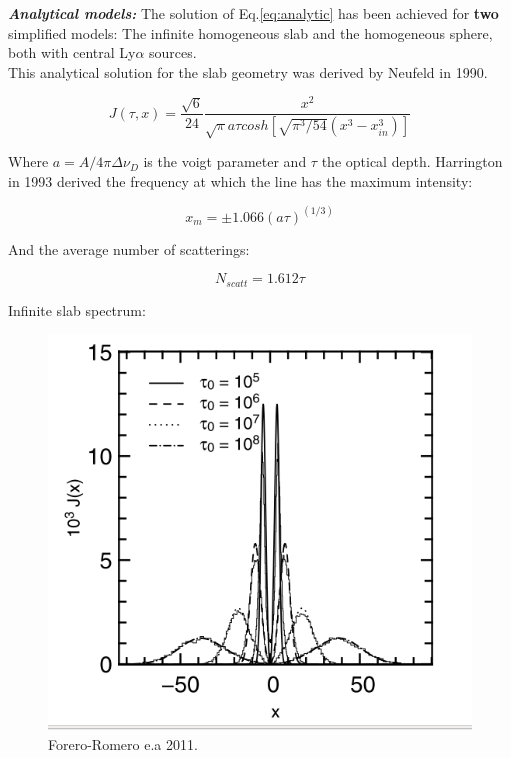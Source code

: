 \documentclass{beamer}
\begin{document}
\begin{frame}{\textit{\textbf{Analytical models:}}}
The solution of Eq.\ref{eq:analytic} has been achieved for \textbf{two} simplified 
models: The infinite homogeneous slab and the homogeneous sphere, both with central 
Ly$\alpha$ sources.\\

This analytical solution for the slab geometry was derived by Neufeld in 1990.  

\begin{equation}
J(\tau, x) = \dfrac{\sqrt{6}}{24}\dfrac{x^2}{\sqrt{\pi}a \tau cosh[\sqrt{\pi^3/54}(x^3 - x_{in}^3)]}
\end{equation}

Where $a = A / 4\pi \Delta \nu_D$ is the voigt parameter and $\tau$ the optical depth. Harrington in 
1993 derived the frequency at which the line has the maximum intensity:

\[
x_m = \pm 1.066 (a\tau)^(1/3)
\]

And the average number of scatterings:

\[
N_{scatt} = 1.612 \tau
\]

\end{frame}

\begin{frame}{Infinite slab spectrum:}
\begin{figure}
\includegraphics[scale=0.4]{Figures/slab.png}
\caption*{Forero-Romero e.a 2011.}
\end{figure}
\end{frame}
\end{document}
